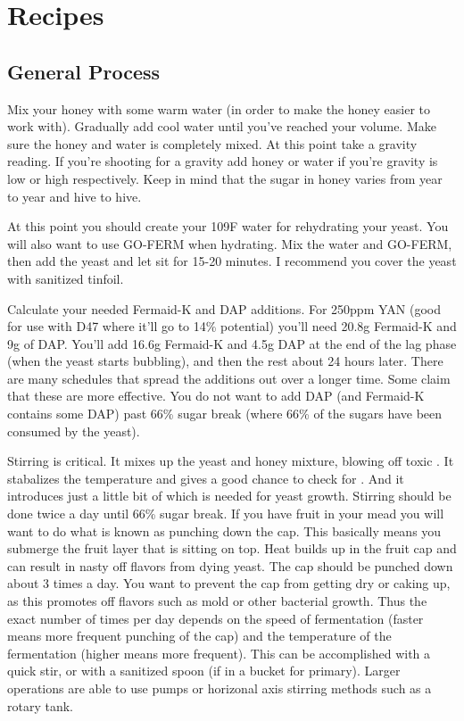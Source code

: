 \documentclass{article}
\begin{document}
{\section{Recipes}
 \subsection{General Process}
  Mix your honey with some warm water (in order to make the honey easier to work with). Gradually add cool water until you've reached your volume. 
  Make sure the honey and water is completely mixed. At this point take a gravity reading. If you're shooting for a gravity add honey or water if 
  you're gravity is low or high respectively. Keep in mind that the sugar in honey varies from year to year and hive to hive.

  At this point you should create your 109\textdegree F water for rehydrating your yeast. You will also want to use GO-FERM when hydrating. Mix the water and GO-FERM, then add the yeast and let sit for 15-20 minutes. I recommend you cover the yeast with sanitized tinfoil.

  Calculate your needed Fermaid-K and DAP additions. For 250ppm YAN (good for use with D47 where it'll go to 14\% potential) you'll need 20.8g Fermaid-K and 9g of DAP.
  You'll add 16.6g Fermaid-K and 4.5g DAP at the end of the lag phase (when the yeast starts bubbling), and then the rest about 24 hours later. 
  There are many schedules that spread the additions out over a longer time. Some claim that these are more effective. 
  You do not want to add DAP (and Fermaid-K contains some DAP) past 66\% sugar break (where 66\% of the sugars have been consumed by the yeast).

  Stirring is critical. It mixes up the yeast and honey mixture, blowing off toxic . 
  It stabalizes the temperature and gives a good chance to check for . And it introduces just a little bit of  which is needed for yeast growth.
  Stirring should be done twice a day until 66\% sugar break. If you have fruit in your mead you will want to do what is known as punching down the cap.
  This basically means you submerge the fruit layer that is sitting on top. Heat builds up in the fruit cap and can result in nasty off flavors from dying yeast.
  The cap should be punched down about 3 times a day. 
  You want to prevent the cap from getting dry or caking up, as this promotes off flavors such as mold or other bacterial growth. 
  Thus the exact number of times per day depends on the speed of fermentation (faster means more frequent punching of the cap) and the temperature of the fermentation (higher means more frequent).
  This can be accomplished with a quick stir, or with a sanitized spoon (if in a bucket for primary). 
  Larger operations are able to use pumps or horizonal axis stirring methods such as a rotary tank.

}
\end{document}
